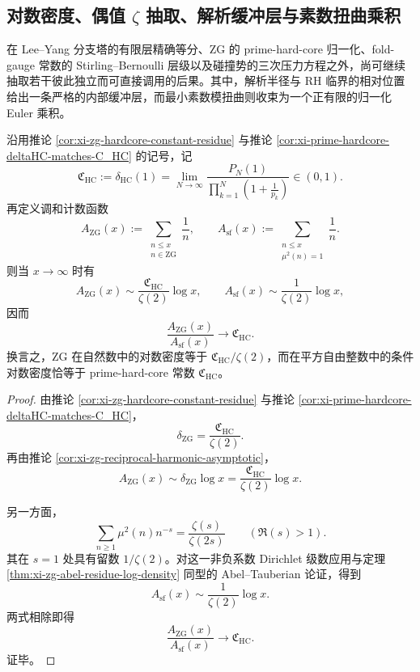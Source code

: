 \subsection{对数密度、偶值 \texorpdfstring{$\zeta$}{zeta} 抽取、解析缓冲层与素数扭曲乘积}

在 Lee--Yang 分支塔的有限层精确等分、\(\mathrm{ZG}\) 的 prime-hard-core 归一化、fold-gauge 常数的 Stirling--Bernoulli 层级以及碰撞势的三次压力方程之外，尚可继续抽取若干彼此独立而可直接调用的后果。其中，解析半径与 RH 临界的相对位置给出一条严格的内部缓冲层，而最小素数模扭曲则收束为一个正有限的归一化 Euler 乘积。

\begin{theorem}\label{thm:derived-zg-squarefree-conditional-logdensity-hardcore}
沿用推论 \ref{cor:xi-zg-hardcore-constant-residue} 与推论 \ref{cor:xi-prime-hardcore-deltaHC-matches-C_HC} 的记号，记
\[
\mathfrak C_{\mathrm{HC}}
:=
\delta_{\mathrm{HC}}(1)
=
\lim_{N\to\infty}\frac{P_N(1)}{\prod_{k=1}^{N}\left(1+\frac1{p_k}\right)}
\in(0,1).
\]
再定义调和计数函数
\[
A_{\mathrm{ZG}}(x):=
\sum_{\substack{n\le x\\ n\in \mathrm{ZG}}}\frac1n,
\qquad
A_{\mathrm{sf}}(x):=
\sum_{\substack{n\le x\\ \mu^2(n)=1}}\frac1n.
\]
则当 \(x\to\infty\) 时有
\[
A_{\mathrm{ZG}}(x)\sim \frac{\mathfrak C_{\mathrm{HC}}}{\zeta(2)}\log x,
\qquad
A_{\mathrm{sf}}(x)\sim \frac{1}{\zeta(2)}\log x,
\]
因而
\[
\frac{A_{\mathrm{ZG}}(x)}{A_{\mathrm{sf}}(x)}\longrightarrow \mathfrak C_{\mathrm{HC}}.
\]
换言之，\(\mathrm{ZG}\) 在自然数中的对数密度等于 \(\mathfrak C_{\mathrm{HC}}/\zeta(2)\)，而在平方自由整数中的条件对数密度恰等于 prime-hard-core 常数 \(\mathfrak C_{\mathrm{HC}}\)。
\end{theorem}
\begin{proof}
由推论 \ref{cor:xi-zg-hardcore-constant-residue} 与推论 \ref{cor:xi-prime-hardcore-deltaHC-matches-C_HC}，
\[
\delta_{\mathrm{ZG}}=\frac{\mathfrak C_{\mathrm{HC}}}{\zeta(2)}.
\]
再由推论 \ref{cor:xi-zg-reciprocal-harmonic-asymptotic}，
\[
A_{\mathrm{ZG}}(x)\sim \delta_{\mathrm{ZG}}\log x
=\frac{\mathfrak C_{\mathrm{HC}}}{\zeta(2)}\log x.
\]

另一方面，
\[
\sum_{n\ge 1}\mu^2(n)n^{-s}=\frac{\zeta(s)}{\zeta(2s)}
\qquad(\Re(s)>1).
\]
其在 \(s=1\) 处具有留数 \(1/\zeta(2)\)。对这一非负系数 Dirichlet 级数应用与定理 \ref{thm:xi-zg-abel-residue-log-density} 同型的 Abel--Tauberian 论证，得到
\[
A_{\mathrm{sf}}(x)\sim \frac{1}{\zeta(2)}\log x.
\]
两式相除即得
\[
\frac{A_{\mathrm{ZG}}(x)}{A_{\mathrm{sf}}(x)}\to \mathfrak C_{\mathrm{HC}}.
\]
证毕。
\end{proof}

